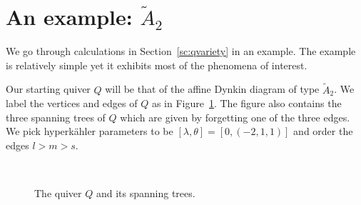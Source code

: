 \documentclass{amsart}
\theoremstyle{definition}
\begin{document}
\section{An example: $\widetilde{A}_2$}

We go through calculations in Section~\ref{sc:qvariety} in an example.
The example is relatively simple yet it exhibits most of the phenomena of interest.

Our starting quiver $Q$ will be that of the affine Dynkin diagram of type $\widetilde{A}_2$.
We label the vertices and edges of $Q$ as in Figure~\ref{fig:A_2graph}.
The figure also contains the three spanning trees of $Q$ which are given by forgetting one of the three edges.
We pick hyperk\"ahler parameters to be $[\lambda,\theta] = [0,(-2,1,1)]$ and order the edges $l>m>s$. 
\begin{figure}[H]
\centering
{}
\\
\quad \quad
{} \quad \quad
{}
\caption{The quiver $Q$ and its spanning trees.}\label{fig:A_2graph}
\end{figure}
\end{document}
